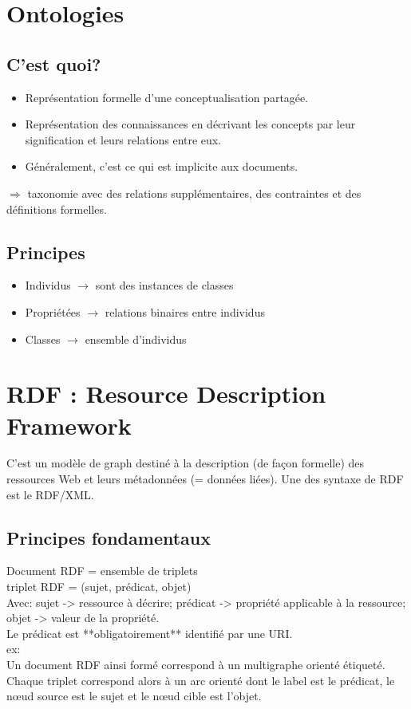 \documentclass[11pt,a4paper]{article}
\begin{document}
\section{Ontologies}
\subsection{C'est quoi?}
\begin{itemize}
    \item Représentation formelle d'une conceptualisation partagée.
    \item Représentation des connaissances en décrivant les concepts par leur signification et leurs relations entre eux.
    \item Généralement, c'est ce qui est implicite aux documents.
\end{itemize}
$\Rightarrow$ taxonomie avec des relations supplémentaires, des contraintes et des définitions formelles.

\subsection{Principes}
\begin{itemize}
    \item Individus $\rightarrow$ sont des instances de classes
    \item Propriétées $\rightarrow$ relations binaires entre individus
    \item Classes $\rightarrow$ ensemble d'individus
\end{itemize}


\section{RDF : Resource Description Framework}
C'est un modèle de graph destiné à la description (de façon formelle) des ressources Web et leurs métadonnées (= données liées).
Une des syntaxe de RDF est le RDF/XML.

\subsection{Principes fondamentaux}
Document RDF = ensemble de triplets\\
triplet RDF = (sujet, prédicat, objet)\\
Avec: sujet -> ressource à décrire; prédicat -> propriété applicable à la ressource; objet -> valeur de la propriété.\\
Le prédicat est **obligatoirement** identifié par une URI.\\
ex:\\
Un document RDF ainsi formé correspond à un multigraphe orienté étiqueté. Chaque triplet correspond alors à un arc orienté dont le label est le prédicat, le nœud source est le sujet et le nœud cible est l'objet.
\end{document}
